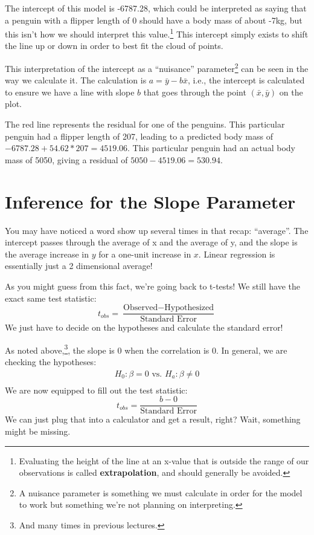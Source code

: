 \documentclass[
  letterpaper,
  DIV=11,
  numbers=noendperiod]{scrreprt}
\begin{document}
The intercept of this model is -6787.28, which could be interpreted as
saying that a penguin with a flipper length of 0 should have a body mass
of about -7kg, but this isn't how we should interpret this
value.\footnote{Evaluating the height of the line at an x-value that is
  outside the range of our observations is called
  \textbf{extrapolation}, and should generally be avoided.} This
intercept simply exists to shift the line up or down in order to best
fit the cloud of points.

This interpretation of the intercept as a ``nuisance''
parameter\footnote{A nuisance parameter is something we must calculate
  in order for the model to work but something we're not planning on
  interpreting.} can be seen in the way we calculate it. The calculation
is \(a = \bar y - b\bar x\), i.e., the intercept is calculated to ensure
we have a line with slope \(b\) that goes through the point
\((\bar x, \bar y)\) on the plot.

The red line represents the residual for one of the penguins. This
particular penguin had a flipper length of 207, leading to a predicted
body mass of \(-6787.28 + 54.62*207 = 4519.06\). This particular penguin
had an actual body mass of 5050, giving a residual of
\(5050 - 4519.06 = 530.94\).

\hypertarget{inference-for-the-slope-parameter}{%
\section{Inference for the Slope
Parameter}\label{inference-for-the-slope-parameter}}

You may have noticed a word show up several times in that recap:
``average''. The intercept passes through the average of x and the
average of y, and the slope is the average increase in \(y\) for a
one-unit increase in \(x\). Linear regression is essentially just a 2
dimensional average!

As you might guess from this fact, we're going back to t-tests! We still
have the exact same test statistic: \[
t_{obs} = \frac{\text{Observed} - \text{Hypothesized}}{\text{Standard Error}}
\] We just have to decide on the hypotheses and calculate the standard
error!

As noted above,\footnote{And many times in previous lectures.}, the
slope is 0 when the correlation is 0. In general, we are checking the
hypotheses: \begin{align*}
H_0: \beta = 0\text{ vs. }H_a: \beta\ne 0\\
\end{align*} We are now equipped to fill out the test statistic: \[
t_{obs} = \frac{b - 0}{\text{Standard Error}}
\] We can just plug that into a calculator and get a result, right?
Wait, something might be missing.
\end{document}
